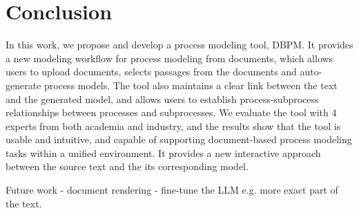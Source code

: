 \chapter{Conclusion}
\label{sec:conclusion}

In this work, we propose and develop a process modeling tool, DBPM. It provides a new modeling workflow for process modeling from documents, which allows users to upload documents, selects passages from the documents and auto-generate process models. The tool also maintains a clear link between the text and the generated model, and allows users to establish process-subprocess relationships between processes and subprocesses. We evaluate the tool with 4 experts from both academia and industry, and the results show that the tool is usable and intuitive, and capable of supporting document-based process modeling tasks within a unified environment.
It provides a new interactive approach between the source text and the its corresponding model.

Future work 
- document rendering
- fine-tune the LLM e.g. more exact part of the text.